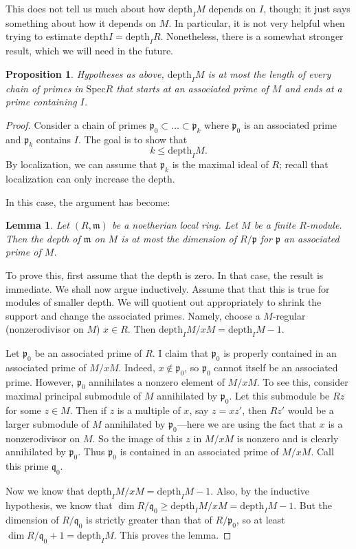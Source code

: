 \documentclass{article}
\newtheorem{lemma}{Lemma}
\newtheorem{proposition}{Proposition}
\begin{document}
This does not tell us much about how $\mathrm{depth}_I M$ depends on $I$, though; it
just says something about how it depends on $M$. In particular, it is not very
helpful when trying to estimate $\mathrm{depth} I = \mathrm{depth}_I R$.
Nonetheless, there is a somewhat stronger result, which we will need in the
future.

\begin{proposition} 
Hypotheses as above, $\mathrm{depth}_I M$ is at most the length of every  chain
of primes in $\mathrm{Spec} R$ that starts at an associated prime of $M$ and
ends at a prime containing $I$.
\end{proposition} 

\begin{proof} Consider a chain of primes $\mathfrak{p}_0 \subset \dots \subset
\mathfrak{p}_k$ where $\mathfrak{p}_0$ is an associated prime and
$\mathfrak{p}_k$ contains $I$. 
The goal is to show that 
\[ k \leq \mathrm{depth}_I M.  \]
By localization, we can assume that $\mathfrak{p}_k$ is the maximal ideal of
$R$; recall that localization can only increase the depth.

In this case, the argument has become:
\begin{lemma} 
Let $(R,\mathfrak{m})$ be a noetherian local ring. Let $M$ be a finite
$R$-module. Then the depth of $\mathfrak{m}$ on $M$ is at most the dimension of
$R/\mathfrak{p}$ for $\mathfrak{p}$ an associated prime of $M$.
\end{lemma} 

To prove this, first assume that the depth is zero. In that case, the result is
immediate. We shall now argue inductively.
Assume that that this is true for modules of smaller depth. 
We will quotient out appropriately to shrink the
support and change the associated 
primes. Namely, choose a $M$-regular (nonzerodivisor on $M$) $x \in R$. 
Then $\mathrm{depth}_I M/xM = \mathrm{depth}_I M -1$. 

Let $\mathfrak{p}_0$ be an associated prime of $R$.
I claim that $\mathfrak{p}_0$ is properly contained in an associated prime of
$M/xM$. Indeed, $x \notin \mathfrak{p}_0$, so $\mathfrak{p}_0$ cannot itself be
an associated prime. 
However, $\mathfrak{p}_0$ annihilates a nonzero element of $M/xM$. To see this,
consider maximal principal submodule of $M$ annihilated by $\mathfrak{p}_0$.
Let this submodule be $Rz$ for some $z \in M$. Then if $z$ is a multiple of
$x$, say $z = xz'$, then $Rz'$ would be a larger
submodule of $M$ annihilated by $\mathfrak{p}_0$---here we are using the fact
that $x$ is a nonzerodivisor on $M$. So the image of this $z$ in $M/xM$ is
nonzero and is clearly annihilated by $\mathfrak{p}_0$. 
Thus $\mathfrak{p}_0$ is contained in an associated prime of $M/xM$. Call this
prime $\mathfrak{q}_0$. 

Now we know that $\mathrm{depth}_I M/xM = \mathrm{depth}_I M -1$. Also, by the inductive
hypothesis, we know that $\dim R/\mathfrak{q}_0 \geq \mathrm{depth}_I M/xM = \mathrm{depth}_I M
-1$. But the dimension of $R/\mathfrak{q}_0$ is strictly greater than that of
$R/\mathfrak{p}_0$, so at least $\dim R/\mathfrak{q}_0 +1 = \mathrm{depth}_I M$. This
proves the lemma.
\end{proof} 
\end{document}
